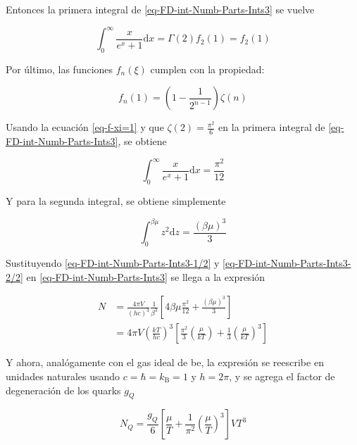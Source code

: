 Entonces la primera integral de \eqref{eq-FD-int-Numb-Parts-Ints3} se vuelve

\begin{equation}
\int_{0}^{\infty} \frac{x}{{e}^{x} + 1} \mathrm{d} x = \Gamma(2) {f}_{2}(1) = {f}_{2}(1)
\end{equation}

Por último, las funciones ${f}_{n}(\xi)$ cumplen con la propiedad:

\begin{equation}\label{eq-f-xi=1}
{f}_{n}(1) = \left(1 - \frac{1}{{2}^{n-1}} \right) \zeta (n)
\end{equation}

Usando la ecuación \eqref{eq-f-xi=1} y que $\zeta(2)= \displaystyle \frac{{\pi}^{2}}{6}$ en la primera integral de \eqref{eq-FD-int-Numb-Parts-Ints3}, se obtiene

\begin{equation}\label{eq-FD-int-Numb-Parts-Ints3-1/2}
\int_{0}^{\infty} \frac{x}{{e}^{x} + 1} \mathrm{d} x = \frac{{\pi}^{2}}{12}
\end{equation}

Y para la segunda integral, se obtiene simplemente

\begin{equation}\label{eq-FD-int-Numb-Parts-Ints3-2/2}
\int_{0}^{\beta \mu} {z}^{2} \mathrm{d}z = \frac{(\beta \mu)^{3}}{3}
\end{equation}

Sustituyendo \eqref{eq-FD-int-Numb-Parts-Ints3-1/2} y \eqref{eq-FD-int-Numb-Parts-Ints3-2/2} en \eqref{eq-FD-int-Numb-Parts-Ints3} se llega a la expresión

\begin{equation}
\begin{split}
N & = \frac{4 \pi V}{(hc)^{3}} \frac{1}{{\beta}^{3}} \left[4 \beta \mu \frac{{\pi}^{2}}{12} + \frac{(\beta \mu)^{3}}{3} \right] \\
& = 4 \pi V \left(\frac{kT}{hc} \right)^{3} \left[ \frac{{\pi}^{2}}{3} \left(\frac{\mu}{kT}\right) + \frac{1}{3} \left(\frac{\mu}{kT} \right)^{3} \right]
\end{split}
\end{equation}

Y ahora, analógamente con el gas ideal de \acrshort{be}, la expresión se reescribe en unidades naturales usando $c=\hbar = {k}_{\mathrm{B}} = 1$ y $h = 2\pi$, y se agrega el factor de degeneración de los quarks ${g}_{Q}$

\begin{equation}\label{eq-FD-Total-Number-Particles-Quarks}
{N}_{Q} = \frac{{g}_{Q}}{6} \left[\frac{\mu}{T} + \frac{1}{{\pi}^{2}} \left(\frac{\mu}{T} \right)^{3} \right] V{T}^{3}
\end{equation}

